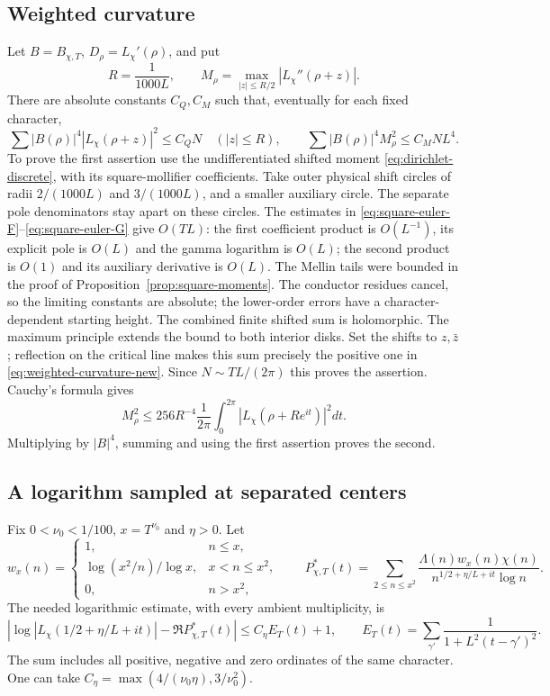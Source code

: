 \subsection{Weighted curvature}
Let $B=B_{\chi,T}$, $D_\rho=L_\chi'(\rho)$, and put
\[
 R=\frac1{1000L},\qquad
 M_\rho=\max_{|z|\le R/2}|L_\chi''(\rho+z)|.
\]
There are absolute constants $C_Q,C_M$ such that, eventually for each
fixed character,
\begin{equation}\label{eq:weighted-curvature-new}
 \sum|B(\rho)|^4|L_\chi(\rho+z)|^2\le C_QN
       \quad(|z|\le R),\qquad
 \sum|B(\rho)|^4M_\rho^2\le C_MNL^4.
\end{equation}
To prove the first assertion use the undifferentiated shifted moment
\eqref{eq:dirichlet-discrete}, with its square-mollifier coefficients.
Take outer physical shift circles of radii $2/(1000L)$ and
$3/(1000L)$, and a smaller auxiliary circle. The separate pole
denominators stay apart on these circles. The estimates in
\eqref{eq:square-euler-F}--\eqref{eq:square-euler-G} give $O(TL)$:
the first coefficient product is $O(L^{-1})$, its explicit pole is
$O(L)$ and the gamma logarithm is $O(L)$; the second product is
$O(1)$ and its auxiliary derivative is $O(L)$.
The Mellin tails were bounded in the proof of
Proposition~\ref{prop:square-moments}. The conductor residues cancel,
so the limiting constants are absolute; the lower-order errors have a
character-dependent starting height. The combined finite shifted sum
is holomorphic. The maximum principle extends the bound to both
interior disks. Set the shifts to $z,\bar z$; reflection on the
critical line makes this sum precisely the positive one in
\eqref{eq:weighted-curvature-new}. Since $N\sim TL/(2\pi)$ this
proves the assertion. Cauchy's formula gives
\[
 M_\rho^2\le256R^{-4}\frac1{2\pi}
                  \int_0^{2\pi}|L_\chi(\rho+Re^{it})|^2dt.
\]
Multiplying by $|B|^4$, summing and using the first assertion proves
the second.

\subsection{A logarithm sampled at separated centers}
Fix $0<\nu_0<1/100$, $x=T^{\nu_0}$ and $\eta>0$. Let
\[
 w_x(n)=\begin{cases}
 1,&n\le x,\\
 \log(x^2/n)/\log x,&x<n\le x^2,\\
 0,&n>x^2,
 \end{cases}
 \qquad
 P^*_{\chi,T}(t)=\sum_{2\le n\le x^2}
 \frac{\Lambda(n)w_x(n)\chi(n)}{n^{1/2+\eta/L+it}\log n}.
\]
The needed logarithmic estimate, with every ambient multiplicity, is
\begin{equation}\label{eq:log-kernel-new}
 \left|\log|L_\chi(1/2+\eta/L+it)|-\Re P^*_{\chi,T}(t)\right|
 \le C_\eta E_T(t)+1,\qquad
 E_T(t)=\sum_{\gamma'}\frac1{1+L^2(t-\gamma')^2}.
\end{equation}
The sum includes all positive, negative and zero ordinates of the
same character. One can take
$C_\eta=\max(4/(\nu_0\eta),3/\nu_0^2)$.

